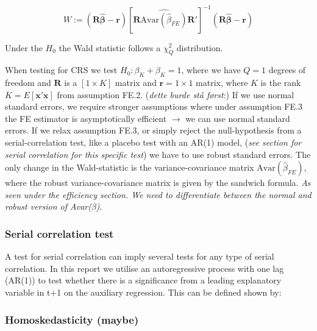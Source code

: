 \begin{equation*}
    W:=(\mathbf{R}\widehat{\boldsymbol{\beta}}-\mathbf{r})[\mathbf{R}\widehat{\text{Avar}(\widehat{\beta}_{FE})}\mathbf{R}']^{-1}(\mathbf{R} \boldsymbol{\widehat{\beta}}-\mathbf{r})
\end{equation*}

Under the $H_0$ the Wald statistic follows a $\chi^2_Q$ distribution.

When testing for CRS we test $H_0:\beta_K+\beta_K=1$, where we have $Q=1$ degrees of freedom and  $\mathbf{R}$ is a $[1 \times K]$ matrix and $\textbf{r}=1 \times 1$ matrix, where $K$ is the rank $K=E[\textbf{x}'\textbf{x}]$  from assumption FE.2. (\textit{dette burde stå først}:) If we use normal standard errors, we require stronger assumptions where under assumption FE.3 the FE estimator is asymptotically efficient $\rightarrow$ we can use normal standard errors. If we relax assumption FE.3, or simply reject the null-hypothesis from a serial-correlation test, like a placebo test with an AR(1) model, (\textit{see section for serial correlation for this specific test}) we have to use robust standard errors. The only change in the Wald-statistic is the variance-covariance matrix $\text{Avar}(\hat{\beta}_{FE})$, where the robust variance-covariance matrix is given by the sandwich formula. \newline
\textit{As seen under the efficiency section. We need to differentiate between the normal and robust version of Avar($\beta$)}.


\subsubsection*{Serial correlation test}
A test for serial correlation can imply several tests for any type of serial correlation. In this report we utilise an autoregressive process with one lag (AR(1)) to test whether there is a significance from a leading explanatory variable in t+1 on the auxiliary regression. This can be defined shown by:

\subsubsection*{Homoskedasticity (maybe)}

